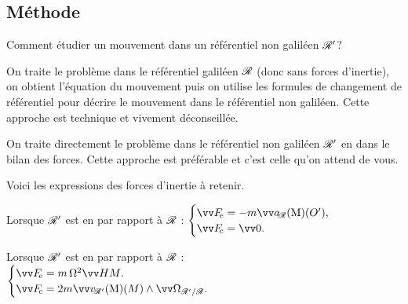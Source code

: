 \documentclass[12pt,fancy]{cours}
\begin{document}
\subsection{Méthode}

Comment étudier un mouvement dans un référentiel non galiléen $\mathcal{R}'$?

\begin{liste}
\item  On traite le problème dans le référentiel galiléen $\mathcal{R}$ (donc sans forces d'inertie), on obtient l'équation du mouvement puis on utilise les formules de changement de référentiel pour décrire le mouvement dans le référentiel non galiléen. Cette approche est technique et vivement déconseillée.
\item On traite directement le problème dans le référentiel non galiléen $\mathcal{R}'$ en  dans le bilan des forces. Cette approche est préférable et c'est celle qu'on attend de vous.
\end{liste}
Voici les expressions des forces d'inertie à retenir.

\begin{theorem}\label{form:inertie_rota}
\begin{liste}
  \item Lorsque $\mathcal{R}'$ est en  par rapport à $\mathcal{R}$ :
  $
  \begin{cases}
\Fe = -m \aR(O'), \\
\Fc = \Vec{0}.
  \end{cases}
  $
  \item Lorsque $\mathcal{R}'$ est en  par rapport à $\mathcal{R}$ :
  $
  \begin{cases}
\Fe = m \,\Omega^2 \Vec{HM}. \\
\Fc = 2m \vRp(M) \pv \OR.
  \end{cases}
  $
\end{liste}
\end{theorem}
\end{document}

